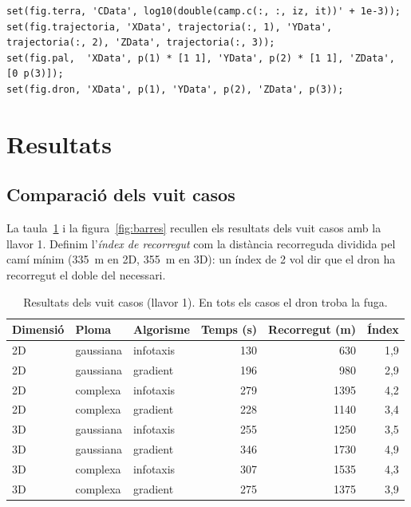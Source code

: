 \documentclass[11pt,a4paper]{article}
\begin{document}
\begin{lstlisting}[caption={Actualització dels objectes gràfics amb \texttt{set} (part d'\texttt{actualitzar\_figura}).}, label=lst:dibuix]
% Escena real: tall horitzontal de la matriu a l'alcada del dron
set(fig.terra, 'CData', log10(double(camp.c(:, :, iz, it))' + 1e-3));
set(fig.trajectoria, 'XData', trajectoria(:, 1), 'YData', trajectoria(:, 2), 'ZData', trajectoria(:, 3));
set(fig.pal,  'XData', p(1) * [1 1], 'YData', p(2) * [1 1], 'ZData', [0 p(3)]);
set(fig.dron, 'XData', p(1), 'YData', p(2), 'ZData', p(3));
\end{lstlisting}

\section{Resultats}

\subsection{Comparació dels vuit casos}

La taula~\ref{tab:resultats} i la figura~\ref{fig:barres} recullen els resultats dels vuit casos amb la llavor 1. Definim l'\emph{índex de recorregut} com la distància recorreguda dividida pel camí mínim (335~m en 2D, 355~m en 3D): un índex de 2 vol dir que el dron ha recorregut el doble del necessari.

\begin{table}[htbp]
\centering
\caption{Resultats dels vuit casos (llavor 1). En tots els casos el dron troba la fuga.}
\label{tab:resultats}
\begin{tabular}{@{}lllrrr@{}}
\toprule
Dimensió & Ploma & Algorisme & Temps (s) & Recorregut (m) & Índex \\
\midrule
2D & gaussiana & infotaxis & 130 & 630 & 1,9 \\
2D & gaussiana & gradient & 196 & 980 & 2,9 \\
2D & complexa & infotaxis & 279 & 1395 & 4,2 \\
2D & complexa & gradient & 228 & 1140 & 3,4 \\
\midrule
3D & gaussiana & infotaxis & 255 & 1250 & 3,5 \\
3D & gaussiana & gradient & 346 & 1730 & 4,9 \\
3D & complexa & infotaxis & 307 & 1535 & 4,3 \\
3D & complexa & gradient & 275 & 1375 & 3,9 \\
\bottomrule
\end{tabular}
\end{table}
\end{document}
